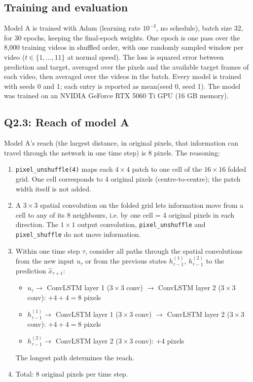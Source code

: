 \documentclass[11pt,letterpaper]{article}
\begin{document}
\subsection*{Training and evaluation}

Model A is trained with Adam (learning rate $10^{-3}$, no schedule), batch size 32, for 30 epochs, keeping the final-epoch
weights. One epoch is one pass over the 8{,}000 training videos in shuffled order, with one randomly sampled window per
video ($t\in\{1,\dots,11\}$ at normal speed). The loss is squared error between prediction and target, averaged over the
pixels and the available target frames of each video, then averaged over the videos in the batch. Every model is trained
with seeds 0 and 1; each entry is reported as mean(seed 0, seed 1). The model was trained on an NVIDIA GeForce RTX 5060 Ti GPU (16 GB memory).

\subsection*{Q2.3: Reach of model A}

Model A's reach (the largest distance, in original pixels, that information can travel through the network in one time
step) is 8 pixels. The reasoning:

\begin{enumerate}
  \item \texttt{pixel\_unshuffle(4)} maps each $4\times4$ patch to one cell of the $16\times16$ folded grid. One cell
        corresponds to 4 original pixels (centre-to-centre); the patch width itself is not added.
  \item A $3\times3$ spatial convolution on the folded grid lets information move from a cell to any of its 8 neighbours,
        i.e. by one cell = 4 original pixels in each direction. The $1\times1$ output convolution,
        \texttt{pixel\_unshuffle} and \texttt{pixel\_shuffle} do not move information.
  \item Within one time step $\tau$, consider all paths through the spatial convolutions from the new input
        $u_\tau$ or from the previous states $h^{(1)}_{\tau-1}$, $h^{(2)}_{\tau-1}$ to the prediction $\hat{x}_{\tau+1}$:
        \begin{itemize}
          \item $u_\tau \to$ ConvLSTM layer 1 ($3\times3$ conv) $\to$ ConvLSTM layer 2 ($3\times3$ conv): $+4+4 = 8$ pixels
          \item $h^{(1)}_{\tau-1} \to$ ConvLSTM layer 1 ($3\times3$ conv) $\to$ ConvLSTM layer 2 ($3\times3$ conv): $+4+4 = 8$ pixels
          \item $h^{(2)}_{\tau-1} \to$ ConvLSTM layer 2 ($3\times3$ conv): $+4$ pixels
        \end{itemize}
        The longest path determines the reach.
  \item Total: 8 original pixels per time step.
\end{enumerate}
\end{document}
